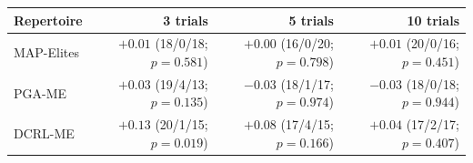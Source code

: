 \begin{tabular}{lrrr}
\toprule
Repertoire & 3 trials & 5 trials & 10 trials \\
\midrule
MAP-Elites & $+0.01$ (18/0/18; $p=0.581$) & $+0.00$ (16/0/20; $p=0.798$) & $+0.01$ (20/0/16; $p=0.451$) \\
PGA-ME & $+0.03$ (19/4/13; $p=0.135$) & $-0.03$ (18/1/17; $p=0.974$) & $-0.03$ (18/0/18; $p=0.944$) \\
DCRL-ME & $+0.13$ (20/1/15; $p=0.019$) & $+0.08$ (17/4/15; $p=0.166$) & $+0.04$ (17/2/17; $p=0.407$) \\
\bottomrule
\end{tabular}
